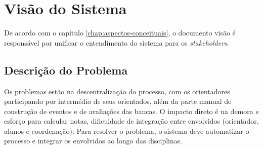 \section{Visão do Sistema}
De acordo com o capítulo \ref{chap:aspectos-conceituais}, o documento visão é responsável por unificar o entendimento do sistema para os \textit{stakeholders}.

\subsection{Descrição do Problema}
Os problemas estão na descentralização do processo, com os orientadores participando por intermédio de seus orientados, além da parte manual de construção de eventos e de avaliações das bancas. O impacto direto é na demora e esforço para calcular notas, dificuldade de integração entre envolvidos (orientador, alunos e coordenação). Para resolver o problema, o sistema deve automatizar o processo e integrar os envolvidos ao longo das disciplinas.

\begin{table}[!htb]
    \centering
    \caption{Sentença básica de posição do produto}
    \label{sentenca-posicao}
\end{table}


